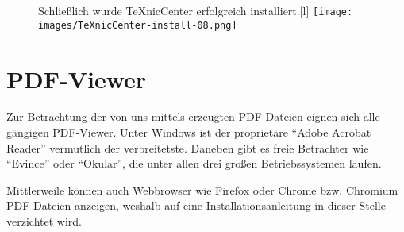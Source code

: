 \begin{figure}[thb]
	\begin{captionbeside}{Schließlich wurde TeXnicCenter erfolgreich installiert.}[l]
		\texttt{[image: images/TeXnicCenter-install-08.png]}
	\end{captionbeside}
	\label{fig:install27}
\end{figure}


\clearpage %


\section{PDF-Viewer}

Zur Betrachtung der von uns mittels \DMLLaTeX{} erzeugten PDF-Dateien eignen sich alle gängigen PDF-Viewer. Unter Windows ist der proprietäre \enquote{Adobe Acrobat Reader} vermutlich der verbreitetste. Daneben gibt es freie Betrachter wie \enquote{Evince} oder \enquote{Okular}, die unter allen drei großen Betriebssystemen laufen. 

Mittlerweile können auch Webbrowser wie Firefox oder Chrome bzw. Chromium PDF-Dateien anzeigen, weshalb auf eine Installationsanleitung in dieser Stelle verzichtet wird.

